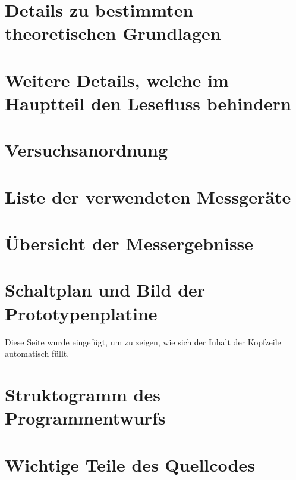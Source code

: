 \iffalse

\setcounter{chapter}{1}

\section{Details zu bestimmten theoretischen Grundlagen}

\section{Weitere Details, welche im Hauptteil den Lesefluss behindern}

\setcounter{chapter}{2}
\setcounter{section}{0}
\setcounter{table}{0}
\setcounter{figure}{0}

\section{Versuchsanordnung}

\section{Liste der verwendeten Messgeräte}

\section{Übersicht der Messergebnisse}

\section{Schaltplan und Bild der Prototypenplatine}

\clearpage

Diese Seite wurde eingefügt, um zu zeigen, wie sich der Inhalt der Kopfzeile automatisch füllt.

\setcounter{chapter}{3}
\setcounter{section}{0}
\setcounter{table}{0}
\setcounter{figure}{0}

\section{Struktogramm des Programmentwurfs}

\section{Wichtige Teile des Quellcodes}

